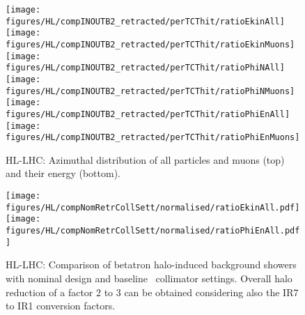 \begin{figure}
\begin{center}
\texttt{[image: figures/HL/compINOUTB2\_retracted/perTCThit/ratioEkinAll]}
\texttt{[image: figures/HL/compINOUTB2\_retracted/perTCThit/ratioEkinMuons]}
\texttt{[image: figures/HL/compINOUTB2\_retracted/perTCThit/ratioPhiNAll]}
\texttt{[image: figures/HL/compINOUTB2\_retracted/perTCThit/ratioPhiNMuons]}
\texttt{[image: figures/HL/compINOUTB2\_retracted/perTCThit/ratioPhiEnAll]}
\texttt{[image: figures/HL/compINOUTB2\_retracted/perTCThit/ratioPhiEnMuons]}
\end{center}
\vspace{-0.6cm}
 \caption{HL-LHC: Azimuthal distribution of all particles and muons (top) and their energy (bottom).
  \label{fig:compInOutB2}}
\end{figure}


\begin{figure}
\centering
\texttt{[image: figures/HL/compNomRetrCollSett/normalised/ratioEkinAll.pdf]}
\texttt{[image: figures/HL/compNomRetrCollSett/normalised/ratioPhiEnAll.pdf]}
 \caption{HL-LHC: Comparison of betatron halo-induced background showers with nominal design and baseline \twosigmaret~collimator settings. Overall halo reduction of a factor 2 to 3 can be obtained considering also the IR7 to IR1 conversion factors\label{fig:compNomRetrSett2}.}
\end{figure}



